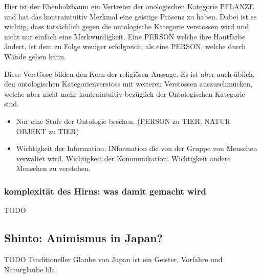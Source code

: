 Hier ist der Ebenholzbaum ein Vertreter der onologischen Kategorie PFLANZE und hat das kontraintuitiv Merkmal eine geistige Präsenz zu haben. Dabei ist es wichtig, dass tatsächlich gegen die ontologische Kategorie verstossen wird und nicht nur einfach eine Merkwürdigkeit. Eine PERSON welche ihre Hautfarbe ändert, ist dem zu Folge weniger erfolgreich, als eine PERSON, welche durch Wände gehen kann. 

Diese Verstösse bilden den Kern der religiösen Aussage. Es ist aber auch üblich, den ontologischen Kategorienverstoss mit weiteren Verstössen auszuschmücken, welche aber nicht mehr kontraintuitiv bezüglich der Ontologischen Kategorie sind.

\begin{itemize}
	\item Nur eine Stufe der Ontologie brechen. (PERSON zu TIER, NATUR OBJEKT zu TIER)
	\item Wichtigkeit der Information. INformation die von der Gruppe von Menschen verwaltet wird. Wichtigkeit der Kommunikation. Wichtigkeit andere Menschen zu verstehen.
\end{itemize}
\subsubsection*{komplexität des Hirns: was damit gemacht wird}

TODO

\subsection{Shinto: Animismus in Japan?}
TODO
Traditioneller Glaube von Japan ist ein Geister, Vorfahre und Naturglaube bla.
